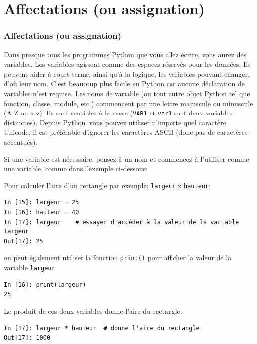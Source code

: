 \documentclass{beamer}
\begin{document}
\section{Affectations (ou assignation)}

\begin{frame}
\frametitle{Affectations (ou assignation)}



Dans presque tous les programmes Python que vous allez écrire, vous aurez des variables. Les variables agissent comme des espaces réservés pour les données. Ils peuvent aider à court terme, ainsi qu’à la logique, les variables pouvant changer, d’où leur nom. C’est beaucoup plus facile en Python car aucune déclaration de variables n’est requise. Les noms de variable (ou tout autre objet Python tel que fonction, classe, module, etc.) commencent par une lettre majuscule ou minuscule (A-Z ou a-z). Ils sont sensibles à la casse (\texttt{VAR1} et \texttt{var1} sont deux variables distinctes). Depuis Python, vous pouvez utiliser n’importe quel caractère Unicode, il est préférable d’ignorer les caractères ASCII (donc pas de caractères accentués).

Si une variable est nécessaire, pensez à un nom et commencez à l'utiliser comme une variable, comme dans l'exemple ci-dessous:


\end{frame}

\begin{frame}

Pour calculer l'aire d'un rectangle par exemple: \texttt{largeur} x \texttt{hauteur}:

\begin{verbatim}
In [15]: largeur = 25
In [16]: hauteur = 40
In [17]: largeur    # essayer d'accéder à la valeur de la variable largeur
Out[17]: 25
\end{verbatim}

on peut également utiliser la fonction \texttt{print()} pour afficher la valeur de la variable \texttt{largeur}

\begin{verbatim}
In [16]: print(largeur)
25
\end{verbatim}
Le produit de ces deux variables donne l'aire du rectangle:
\begin{verbatim}
In [17]: largeur * hauteur  # donne l'aire du rectangle
Out[17]: 1000
\end{verbatim}
\end{frame}
\end{document}
